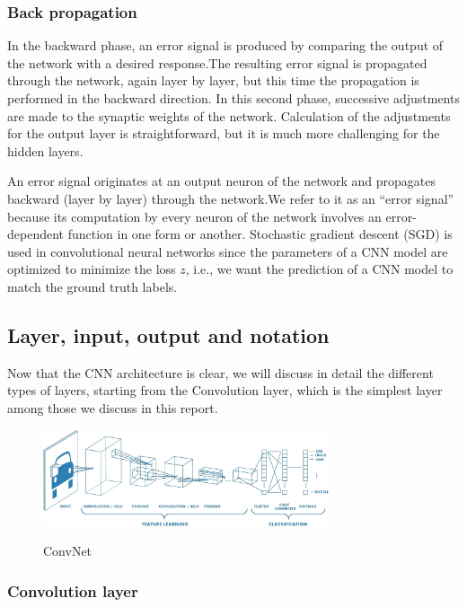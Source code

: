 \documentclass[12pt]{article}
\begin{document}
    \subsubsection{Back propagation}
    
    In the backward phase, an error signal is produced by comparing the output of the network with a desired response.The resulting error signal is propagated through
the network, again layer by layer, but this time the propagation is performed in the backward direction. In this second phase, successive adjustments are made to the
synaptic weights of the network. Calculation of the adjustments for the output layer is straightforward, but it is much more challenging for the hidden layers.

An error signal originates at an output neuron of the network and propagates backward (layer by layer) through the network.We refer to it as an “error signal” because its computation by every neuron of the network involves an
error-dependent function in one form or another. Stochastic gradient descent (SGD) is used in convolutional neural networks since the parameters of a CNN model are optimized to minimize the loss $z$, i.e., we want the prediction of a CNN model to match the ground truth labels.
    \subsection{Layer, input, output and notation}
		    
    Now that the CNN architecture is clear, we will discuss in detail the different types of layers, starting from the Convolution layer, which is the simplest layer among
those we discuss in this report.
\begin{figure}[h]
    	\centering
    	\includegraphics[width=0.75\textwidth]{cnn2.jpg}
       	\label{fig:mesh10}
	\caption{ConvNet}
	\end{figure} 

        \subsubsection{Convolution layer}
		
\end{document}
